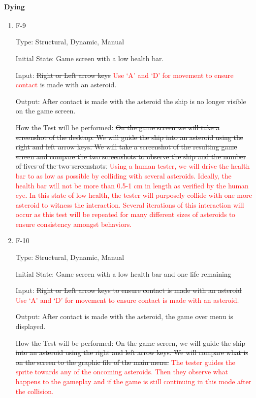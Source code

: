 \documentclass[12pt, titlepage]{article}
\begin{document}
\paragraph{Dying}

\begin{enumerate}

\item{F-9\\}

Type: Structural, Dynamic, Manual

Initial State: Game screen with a low health bar.

Input: \sout{Right or Left arrow keys} \textcolor{red}{Use `A' and `D' for movement to ensure contact} is made with an asteroid.

Output: After contact is made with the asteroid the ship is no longer visible on the game screen.

How the Test will be performed: \sout{ On the game screen we will take a screenshot of the desktop. We will guide the ship into an asteroid using the right and left arrow keys. We will take a screenshot of the resulting game screen and compare the two screenshots to observe the ship and the number of lives of the two screenshots.} \textcolor{red}{Using a human tester, we will drive the health bar to as low as possible by colliding with several asteroids. Ideally, the health bar will not be more than 0.5-1 cm in length as verified by the human eye. In this state of low health, the tester will purposely collide with one more asteroid to witness the interaction. Several iterations of this interaction will occur as this test will be repeated for many different sizes of asteroids to ensure consistency amongst behaviors.}

\item{F-10\\}

Type: Structural, Dynamic, Manual

Initial State: Game screen with a low health bar and one life remaining

Input: \sout{Right or Left arrow keys to ensure contact is made with an asteroid} \textcolor{red}{Use `A' and `D' for movement to ensure contact is made with an asteroid. }

Output: After contact is made with the asteroid, the game over menu is displayed.

How the Test will be performed: \sout{On the game screen, we will guide the ship into an asteroid using the right and left arrow keys. We will compare what is on the screen to the graphic file of the main menu.} \textcolor{red}{The tester guides the sprite towards any of the oncoming asteroids. Then they observe what happens to the gameplay and if the game is still continuing in this mode after the collision.}

\end{enumerate}
\end{document}
